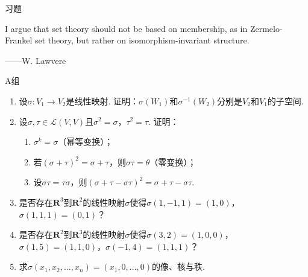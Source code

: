 \vspace{2ex}
\centerline{\heiti \Large 习题}

\vspace{2ex}
I argue that set theory should not be based on membership, as in Zermelo-Frankel set theory, but rather on isomorphism-invariant structure.
\begin{flushright}
    ——W. Lawvere
\end{flushright}

\centerline{\heiti A组}
\begin{enumerate}
    \item 设$\sigma: V_1\to V_2$是线性映射. 证明：$\sigma(W_1)$和$\sigma^{-1}(W_2)$分别是$V_2$和$V_1$的子空间.

    \item 设$\sigma,\tau \in \mathcal{L}(V,V)$且$\sigma^2=\sigma$，$\tau^2=\tau$. 证明：
          \begin{enumerate}
              \item $\sigma^k=\sigma$（幂等变换）；

              \item 若$(\sigma+\tau)^2=\sigma+\tau$，则$\sigma\tau=\theta$（零变换）；

              \item 设$\sigma\tau=\tau\sigma$，则$(\sigma+\tau-\sigma\tau)^2=\sigma+\tau-\sigma\tau$.
          \end{enumerate}

    \item 是否存在$\mathbf{R}^3$到$\mathbf{R}^2$的线性映射$\sigma$使得$\sigma(1,-1,1)=(1,0)$，$\sigma(1,1,1)=(0,1)$？

    \item 是否存在$\mathbf{R}^2$到$\mathbf{R}^3$的线性映射$\sigma$使得$\sigma(3,2)=(1,0,0)$，$\sigma(1,5)=(1,1,0)$，$\sigma(-1,4)=(1,1,1)$？

    \item 求$\sigma(x_1,x_2,\ldots,x_n)=(x_1,0,\ldots,0)$的像、核与秩.
\end{enumerate}

